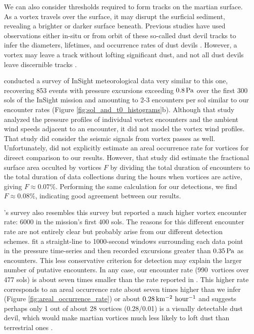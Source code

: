 \documentclass{aastex63}
\newcommand{\totalvortices}{990}
\begin{document}
We can also consider thresholds required to form tracks on the martian surface. As a vortex travels over the surface, it may disrupt the surficial sediment, revealing a brighter or darker surface beneath. Previous studies have used observations either in-situ or from orbit of these so-called dust devil tracks to infer the diameters, lifetimes, and occurrence rates of dust devils \citep{}. However, a vortex may leave a track without lofting significant dust, and not all dust devils leave discernible tracks \citep{2005JGRE..110.6002G}.


\citet{2021Icar..35514119L} conducted a survey of InSight meteorological data very similar to this one, recovering 853 events with pressure excursions exceeding $0.8\,{\rm Pa}$ over the first 300 sols of the InSight mission and amounting to 2-3 encounters per sol similar to our encounter rates (Figure \ref{fig:sol_and_t0_histograms}b). Although that study analyzed the pressure profiles of individual vortex encounters and the ambient wind speeds adjacent to an encounter, it did not model the vortex wind profiles. That study did consider the seismic signals from vortex passes as well. Unfortunately, \citet{2021Icar..35514119L} did not explicitly estimate an areal occurrence rate for vortices for direect comparison to our results. However, that study did estimate the fractional surface area occulted by vortices $F$ by dividing the total duration of encounters to the total duration of data collections during the hours when vortices are active, giving $F \approx 0.07\%$. Performing the same calculation for our detections, we find $F \approx 0.08\%$, indicating good agreement between our results.


\citet{2021JGRE..12606511S}'s survey also resembles this survey but reported a much higher vortex encounter rate: 6000 in the mission's first 400 sols. The reasons for this different encounter rate are not entirely clear but probably arise from our different detection schemes. \citet{2021JGRE..12606511S} fit a straight-line to 1000-second windows surrounding each data point in the pressure time-series and then recorded excursions greater than $0.35\,{\rm Pa}$ as encounters. This less conservative criterion for detection may explain the larger number of putative encounters. In any case, our encounter rate (\totalvortices\ vortices over 477 sols) is about seven times smaller than the rate reported in \citet{2021JGRE..12606511S}. This higher rate corresponds to an areal occurrence rate about seven times higher than we infer (Figure \ref{fig:areal_occurrence_rate}) or about $0.28\,{\rm km^{-2}\ hour^{-1}}$ and suggests perhaps only 1 out of about 28 vortices (0.28/0.01) is a visually detectable dust devil, which would make martian vortices much less likely to loft dust than terrestrial ones \citep{LORENZ20151}.
\end{document}
